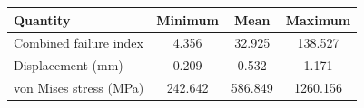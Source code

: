 \begin{tabular}{lccc}
\toprule
Quantity & Minimum & Mean & Maximum \\
\midrule
Combined failure index & 4.356 & 32.925 & 138.527 \\
Displacement (mm) & 0.209 & 0.532 & 1.171 \\
von Mises stress (MPa) & 242.642 & 586.849 & 1260.156 \\
\bottomrule
\end{tabular}
